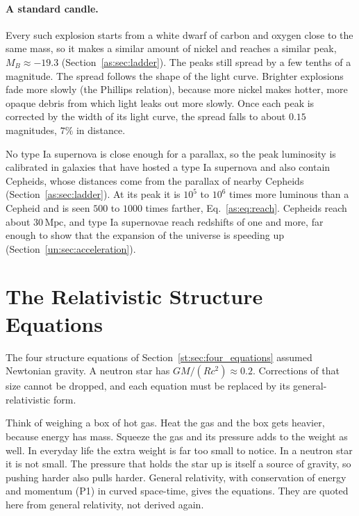 \paragraph{A standard candle.} Every such explosion starts from a white dwarf of carbon and oxygen close to the same mass, so it makes a similar amount of nickel and reaches a similar peak, $M_B\approx-19.3$ (Section~\ref{as:sec:ladder}). The peaks still spread by a few tenths of a magnitude. The spread follows the shape of the light curve. Brighter explosions fade more slowly (the Phillips relation), because more nickel makes hotter, more opaque debris from which light leaks out more slowly. Once each peak is corrected by the width of its light curve, the spread falls to about $0.15$ magnitudes, $7\%$ in distance.

No type Ia supernova is close enough for a parallax, so the peak luminosity is calibrated in galaxies that have hosted a type Ia supernova and also contain Cepheids, whose distances come from the parallax of nearby Cepheids (Section~\ref{as:sec:ladder}). At its peak it is $10^5$ to $10^6$ times more luminous than a Cepheid and is seen $500$ to $1000$ times farther, Eq.~\eqref{as:eq:reach}. Cepheids reach about $30\,\mathrm{Mpc}$, and type Ia supernovae reach redshifts of one and more, far enough to show that the expansion of the universe is speeding up (Section~\ref{un:sec:acceleration}).

\section{The Relativistic Structure Equations}
\label{cs:sec:relativistic}

The four structure equations of Section~\ref{st:sec:four_equations} assumed Newtonian gravity. A neutron star has $GM/(Rc^2)\approx0.2$. Corrections of that size cannot be dropped, and each equation must be replaced by its general-relativistic form.

Think of weighing a box of hot gas. Heat the gas and the box gets heavier, because energy has mass. Squeeze the gas and its pressure adds to the weight as well. In everyday life the extra weight is far too small to notice. In a neutron star it is not small. The pressure that holds the star up is itself a source of gravity, so pushing harder also pulls harder. General relativity, with conservation of energy and momentum (P1) in curved space-time, gives the equations. They are quoted here from general relativity, not derived again.

